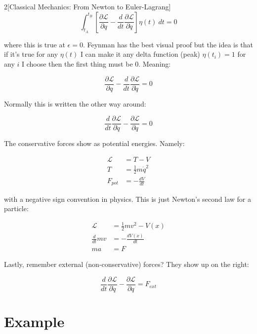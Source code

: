 \documentclass{article}
\begin{document}
\begin{multicols}{2}[Classical Mechanics: From Newton to Euler-Lagrang]
\begin{equation*}
    \int_{t_A}^{t_B} \left[ \frac{\partial \mathcal{L}}{\partial q} - \frac{d}{dt} \frac{\partial \mathcal{L}}{\partial \dot{q}} \right] \eta(t) \ dt = 0
\end{equation*}

where this is true at $\epsilon = 0$. Feynman has the best visual proof but the idea is that if it's true for any $\eta(t)$ I can make it any delta function (peak) $\eta(t_i) =  1$ for any $i$ I choose then the first thing must be 0. Meaning:

\begin{equation}
    \frac{\partial \mathcal{L}}{\partial q} - \frac{d}{dt} \frac{\partial \mathcal{L}}{\partial \dot{q}} = 0
\end{equation}

Normally this is written the other way around:

\begin{equation}
    \frac{d}{dt} \frac{\partial \mathcal{L}}{\partial \dot{q}} - \frac{\partial \mathcal{L}}{\partial q} = 0
\end{equation}

The conservative forces show as potential energies. Namely:

\begin{align*}
    \mathcal{L} &= T - V \\
    T &= \frac{1}{2} m \dot{q}^2 \\
    F_{pot} &= -\frac{d V}{dt}
\end{align*}

with a negative sign convention in physics. This is just Newton's second law for a particle:

\begin{align*}
    \mathcal{L} &= \frac{1}{2} m v^2 - V(x) \\
    \frac{d}{dt} m v&= -\frac{d V(x)}{dt} \\
    m a &= F
\end{align*}


Lastly, remember external (non-conservative) forces? They show up on the right:

\begin{equation}
    \frac{d}{dt} \frac{\partial \mathcal{L}}{\partial \dot{q}} - \frac{\partial \mathcal{L}}{\partial q} = F_{ext}
\end{equation}

\section{Example}


\end{multicols}
\end{document}
